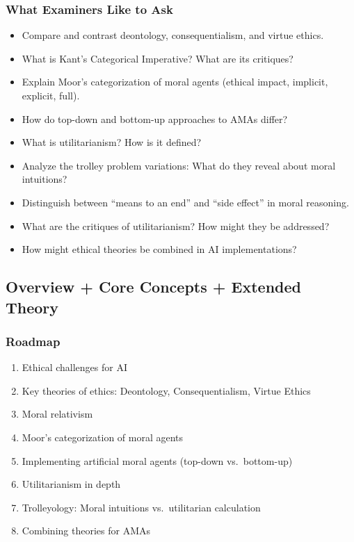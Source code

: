 \separator

\subsubsection*{What Examiners Like to Ask}

\begin{itemize}
  \item Compare and contrast deontology, consequentialism, and virtue ethics.
  \item What is Kant's Categorical Imperative? What are its critiques?
  \item Explain Moor's categorization of moral agents (ethical impact, implicit, explicit, full).
  \item How do top-down and bottom-up approaches to AMAs differ?
  \item What is utilitarianism? How is it defined?
  \item Analyze the trolley problem variations: What do they reveal about moral intuitions?
  \item Distinguish between ``means to an end'' and ``side effect'' in moral reasoning.
  \item What are the critiques of utilitarianism? How might they be addressed?
  \item How might ethical theories be combined in AI implementations?
\end{itemize}

\bigseparator

\subsection{Overview + Core Concepts + Extended Theory}

\subsubsection*{Roadmap}
\begin{enumerate}
  \item Ethical challenges for AI
  \item Key theories of ethics: Deontology, Consequentialism, Virtue Ethics
  \item Moral relativism
  \item Moor's categorization of moral agents
  \item Implementing artificial moral agents (top-down vs.\ bottom-up)
  \item Utilitarianism in depth
  \item Trolleyology: Moral intuitions vs.\ utilitarian calculation
  \item Combining theories for AMAs
\end{enumerate}

